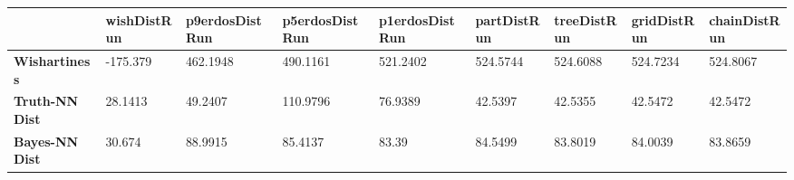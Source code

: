 \begin{tabular}{|l|l|l|l|l|l|l|l|l|}
\hline
&\textbf{wishDistRun}&\textbf{p9erdosDistRun}&\textbf{p5erdosDistRun}&\textbf{p1erdosDistRun}&\textbf{partDistRun}&\textbf{treeDistRun}&\textbf{gridDistRun}&\textbf{chainDistRun}\\\hline
\textbf{Wishartiness}&-175.379&462.1948&490.1161&521.2402&524.5744&524.6088&524.7234&524.8067\\\hline
\textbf{Truth-NN Dist}&28.1413&49.2407&110.9796&76.9389&42.5397&42.5355&42.5472&42.5472\\\hline
\textbf{Bayes-NN Dist}&30.674&88.9915&85.4137&83.39&84.5499&83.8019&84.0039&83.8659\\\hline
\end{tabular}
